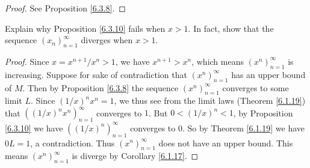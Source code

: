 \begin{proof}
    See Proposition \ref{6.3.8}.
\end{proof}

\begin{exercise}\label{ex 6.3.4}
    Explain why Proposition \ref{6.3.10} fails when \(x > 1\).
    In fact, show that the sequence \((x_n)_{n = 1}^\infty\) diverges when \(x > 1\).
\end{exercise}

\begin{proof}
    Since \(x = x^{n + 1} / x^n > 1\), we have \(x^{n + 1} > x^n\), which means \((x^n)_{n = 1}^\infty\) is increasing.
    Suppose for sake of contradiction that \((x^n)_{n = 1}^\infty\) has an upper bound of \(M\).
    Then by Proposition \ref{6.3.8} the sequence \((x^n)_{n = 1}^\infty\) converges to some limit \(L\).
    Since \((1 / x)^n x^n = 1\), we thus see from the limit laws (Theorem \ref{6.1.19}) that \(((1 / x)^n x^n)_{n = 1}^\infty\) converges to \(1\).
    But \(0 < (1 / x)^n < 1\), by Proposition \ref{6.3.10} we have \(((1 / x)^n)_{n = 1}^\infty\) converges to \(0\).
    So by Theorem \ref{6.1.19} we have \(0L = 1\), a contradiction.
    Thus \((x^n)_{n = 1}^\infty\) does not have an upper bound.
    This means \((x^n)_{n = 1}^\infty\) is diverge by Corollary \ref{6.1.17}.
\end{proof}